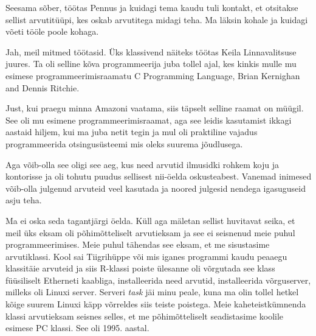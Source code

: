 
Seesama sõber, töötas Pennus ja kuidagi tema kaudu tuli kontakt, 
et otsitakse sellist arvutitüüpi, kes oskab arvutitega midagi teha. Ma läksin 
kohale  ja kuidagi võeti tööle poole kohaga.


Jah, meil mitmed töötasid. Üks klassivend näiteks töötas Keila Linnavalitsuse 
juures. Ta oli selline kõva programmeerija juba tollel ajal, kes kinkis mulle 
mu esimese programmeerimisraamatu C Programming Language, Brian Kernighan and Dennis Ritchie.


Just, kui praegu minna Amazoni vaatama, siis täpselt selline raamat on müügil. 
See oli mu esimene programmeerimisraamat, aga see leidis kasutamist ikkagi 
aastaid hiljem, kui ma juba netit tegin ja mul oli praktiline 
vajadus programmeerida otsingusüsteemi mis oleks suurema jõudlusega.


Aga võib-olla see oligi see aeg, kus need arvutid ilmusidki rohkem koju ja 
kontorisse ja oli tohutu puudus sellisest nii-öelda oskusteabest. Vanemad 
inimesed võib-olla julgenud arvuteid veel kasutada ja noored julgesid nendega 
igasuguseid asju teha.


Ma ei oska seda tagantjärgi öelda. Küll aga mäletan sellist huvitavat seika, et 
meil üks  eksam oli põhimõtteliselt arvutieksam ja see ei seisnenud meie puhul 
programmeerimises. Meie puhul tähendas see eksam, et  me sisustasime 
arvutiklassi.  Kool sai Tiigrihüppe või  mis iganes programmi kaudu peaaegu 
klassitäie arvuteid ja siis R-klassi  poiste ülesanne oli võrgutada see klass 
füüsiliselt Etherneti kaabliga, installeerida need arvutid, installeerida 
võrguserver, milleks oli  Linuxi server. Serveri \emph{task} jäi minu peale, 
kuna ma olin tollel hetkel kõige suurem Linuxi käpp võrreldes 
siis teiste poistega.  Meie kaheteistkümnenda klassi arvutieksam seisnes 
selles, et me põhimõtteliselt seadistasime koolile esimese PC klassi. See oli 
1995. aastal.

